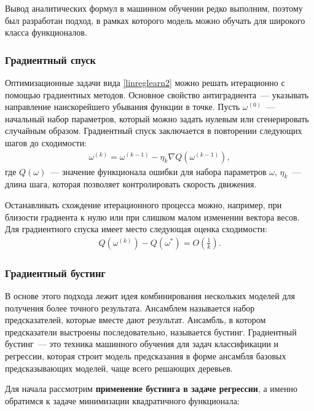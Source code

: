 \documentclass[12pt,a4paper]{article} %
\begin{document}
Вывод аналитических формул в машинном обучении редко выполним, поэтому был разработан подход, в рамках которого модель можно обучать для широкого класса функционалов.

\subsubsection{Градиентный спуск}

Оптимизационные задачи вида \ref{linreglearn2} можно решать итерационно с помощью градиентных методов. Основное свойство антиградиента~--- указывать направление наискорейшего убывания функции в точке. Пусть $\omega^{(0)}$~--- начальный набор параметров, который можно задать нулевым или сгенерировать случайным образом. Градиентный спуск заключается в повторении следующих шагов до сходимости:
 \begin{gather}\label{gradmet1}
	\omega^{(k)} = \omega^{(k-1)} - \eta_k\nabla Q (\omega^{(k-1)}),
\end{gather}
где $Q(\omega)$~--- значение функционала ошибки для набора параметров $\omega$, $\eta_k$~--- длина шага, которая позволяет контролировать скорость движения.

Останавливать схождение итерационного процесса можно, например, при близости градиента к нулю или при слишком малом изменении вектора весов. Для градиентного спуска имеет место следующая оценка сходимости:
 \begin{gather}\label{gradmet2}
	Q(\omega^{(k)})-Q(\omega^*) = O\left(\frac{1}{k}\right).
\end{gather}

\subsubsection{Градиентный бустинг}

В основе этого подхода лежит идея комбинирования нескольких моделей для получения более точного результата. Ансамблем называется набор предсказателей, которые вместе дают результат. Ансамбль, в котором предсказатели выстроены последовательно, называется бустинг. Градиентный бустинг~--- это техника машинного обучения для задач классификации и регрессии, которая строит модель предсказания в форме ансамбля базовых предсказывающих моделей, чаще всего решающих деревьев\cite{Friedman1, Friedman2, Chen, Chen2}. 

Для начала рассмотрим \textbf{применение бустинга в задаче регрессии}, а именно обратимся к задаче минимизации квадратичного функционала:
\end{document}
